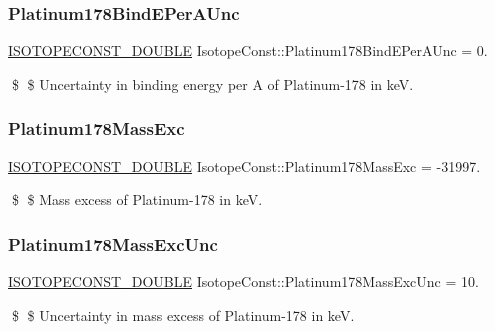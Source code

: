 \subsubsection{\texorpdfstring{Platinum178\+Bind\+E\+Per\+A\+Unc}{Platinum178BindEPerAUnc}}
{\footnotesize\ttfamily \mbox{\hyperlink{group___isotope_const-_macros_ga8f45a7272ce02c0b4c65c44636ed719a}{I\+S\+O\+T\+O\+P\+E\+C\+O\+N\+S\+T\+\_\+\+D\+O\+U\+B\+LE}} Isotope\+Const\+::\+Platinum178\+Bind\+E\+Per\+A\+Unc = 0.}

\$ \$ Uncertainty in binding energy per A of Platinum-\/178 in keV. \mbox{\label{group___isotope_const-_platinum-_pt178_gabfe9d07c55a3682edb412875ee6f2df7}} 
\subsubsection{\texorpdfstring{Platinum178\+Mass\+Exc}{Platinum178MassExc}}
{\footnotesize\ttfamily \mbox{\hyperlink{group___isotope_const-_macros_ga8f45a7272ce02c0b4c65c44636ed719a}{I\+S\+O\+T\+O\+P\+E\+C\+O\+N\+S\+T\+\_\+\+D\+O\+U\+B\+LE}} Isotope\+Const\+::\+Platinum178\+Mass\+Exc = -\/31997.}

\$ \$ Mass excess of Platinum-\/178 in keV. \mbox{\label{group___isotope_const-_platinum-_pt178_gafee6f554a1b284ea9f02b91352c1f9e5}} 
\subsubsection{\texorpdfstring{Platinum178\+Mass\+Exc\+Unc}{Platinum178MassExcUnc}}
{\footnotesize\ttfamily \mbox{\hyperlink{group___isotope_const-_macros_ga8f45a7272ce02c0b4c65c44636ed719a}{I\+S\+O\+T\+O\+P\+E\+C\+O\+N\+S\+T\+\_\+\+D\+O\+U\+B\+LE}} Isotope\+Const\+::\+Platinum178\+Mass\+Exc\+Unc = 10.}

\$ \$ Uncertainty in mass excess of Platinum-\/178 in keV. \mbox{\label{group___isotope_const-_platinum-_pt178_ga6126769674ecd57b8ccd4a8256a462e1}} 
